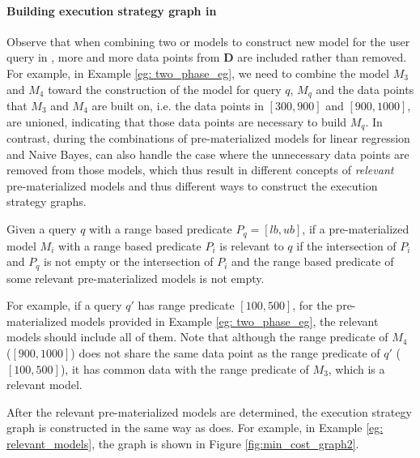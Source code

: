 \paragraph{Building execution strategy graph in \cite{gupta2015processing}} Observe that when combining two or models to construct new model for the user query in \cite{hasani2018efficient}, more and more data points from $\textbf{D}$ are included rather than removed. For example, in Example \ref{eg: two_phase_eg}, we need to combine the model $M_3$ and $M_4$ toward the construction of the model for query $q$, $M_q$ and the data points that $M_3$ and $M_4$ are built on, i.e. the data points in $[300, 900]$ and $[900, 1000]$, are unioned, indicating that those data points are necessary to build $M_q$.  In contrast, during the combinations of pre-materialized models for linear regression and Naive Bayes, \cite{gupta2015processing} can also handle the case where the unnecessary data points are removed from those models, which thus result in different concepts of {\em relevant} pre-materialized models and thus different ways to construct the execution strategy graphs.

Given a query $q$ with a range based predicate $P_q = [lb,ub]$, if a pre-materialized model $M_i$ with a range based predicate $P_i$ is relevant to $q$ if the intersection of $P_i$ and $P_q$ is not empty or the intersection of $P_i$ and the range based predicate of some relevant pre-materialized models is not empty. 

\begin{example}\label{eg: relevant_models}
For example, if a query $q'$ has range predicate $[100, 500]$, for the pre-materialized models provided in Example \ref{eg: two_phase_eg}, the relevant models should include all of them. Note that although the range predicate of $M_4$ ($[900, 1000]$) does not share the same data point as the range predicate of $q'$ ($[100, 500]$), it has common data with the range predicate of $M_3$, which is a relevant model.
\end{example}

After the relevant pre-materialized models are determined, the execution strategy graph is constructed in the same way as \cite{hasani2018efficient} does. For example, in Example \ref{eg: relevant_models}, the graph is shown in Figure \ref{fig:min_cost_graph2}.

